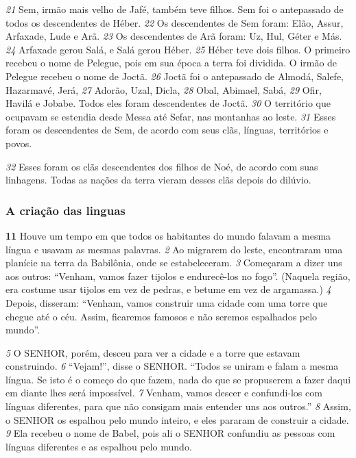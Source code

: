 \bigskip
\textit{\tiny 21}
 Sem, irmão mais velho de Jafé, também teve filhos. Sem foi o antepassado de todos os descendentes de Héber. 
\textit{\tiny 22}
 Os descendentes de Sem foram: Elão, Assur, Arfaxade, Lude e Arã. 
\textit{\tiny 23}
 Os descendentes de Arã foram: Uz, Hul, Géter e Más. 
\textit{\tiny 24}
 Arfaxade gerou Salá, e Salá gerou Héber. 
\textit{\tiny 25}
 Héber teve dois filhos. O primeiro recebeu o nome de Pelegue, pois em sua época a terra foi dividida. O irmão de Pelegue recebeu o nome de Joctã. 
\textit{\tiny 26}
 Joctã foi o antepassado de Almodá, Salefe, Hazarmavé, Jerá, 
\textit{\tiny 27}
 Adorão, Uzal, Dicla, 
\textit{\tiny 28}
 Obal, Abimael, Sabá, 
\textit{\tiny 29}
 Ofir, Havilá e Jobabe. Todos eles foram descendentes de Joctã. 
\textit{\tiny 30}
 O território que ocupavam se estendia desde Messa até Sefar, nas montanhas ao leste. 
\textit{\tiny 31}
 Esses foram os descendentes de Sem, de acordo com seus clãs, línguas, territórios e povos.



\bigskip
\textit{\tiny 32}
 Esses foram os clãs descendentes dos filhos de Noé, de acordo com suas linhagens. Todas as nações da terra vieram desses clãs depois do dilúvio.



\bigskip
\subsubsection*{A criação das linguas}
\textbf{\large 11}
 Houve um tempo em que todos os habitantes do mundo falavam a mesma língua e usavam as mesmas palavras. 
\textit{\tiny 2}
 Ao migrarem do leste, encontraram uma planície na terra da Babilônia, onde se estabeleceram. 
\textit{\tiny 3}
 Começaram a dizer uns aos outros: “Venham, vamos fazer tijolos e endurecê-los no fogo”. (Naquela região, era costume usar tijolos em vez de pedras, e betume em vez de argamassa.) 
\textit{\tiny 4}
 Depois, disseram: “Venham, vamos construir uma cidade com uma torre que chegue até o céu. Assim, ficaremos famosos e não seremos espalhados pelo mundo”.



\bigskip
\textit{\tiny 5}
 O SENHOR, porém, desceu para ver a cidade e a torre que estavam construindo. 
\textit{\tiny 6}
 “Vejam!”, disse o SENHOR. “Todos se uniram e falam a mesma língua. Se isto é o começo do que fazem, nada do que se propuserem a fazer daqui em diante lhes será impossível. 
\textit{\tiny 7}
 Venham, vamos descer e confundi-los com línguas diferentes, para que não consigam mais entender uns aos outros.” 
\textit{\tiny 8}
 Assim, o SENHOR os espalhou pelo mundo inteiro, e eles pararam de construir a cidade. 
\textit{\tiny 9}
 Ela recebeu o nome de Babel, pois ali o SENHOR confundiu as pessoas com línguas diferentes e as espalhou pelo mundo.



